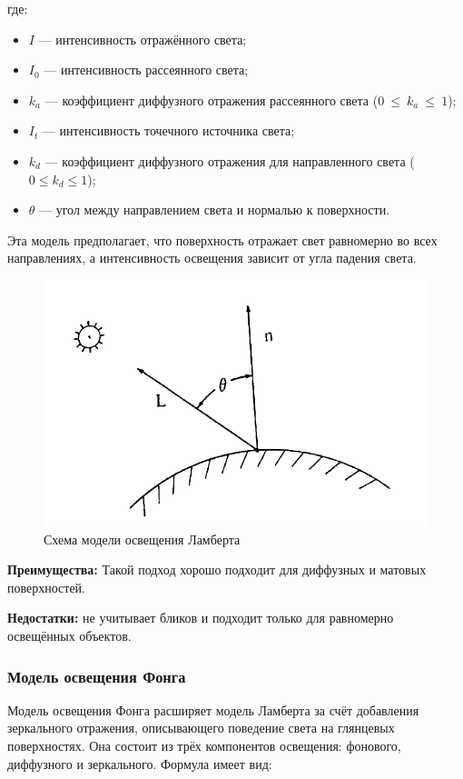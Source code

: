 где:
\begin{itemize}[label=---]
    \item $I$ — интенсивность отражённого света;
    \item $I_0$ — интенсивность рассеянного света;
    \item $k_a$ — коэффициент диффузного отражения рассеянного света ($0~\leq~k_a~\leq~1$);
    \item $I_t$ — интенсивность точечного источника света;
    \item $k_d$ — коэффициент диффузного отражения для направленного света ($0 \leq k_d \leq 1$);
    \item $\theta$ — угол между направлением света и нормалью к поверхности.
\end{itemize}

Эта модель предполагает, что поверхность отражает свет равномерно во всех направлениях, а интенсивность освещения зависит от угла падения света.

\begin{figure}[H]
    \centering
    \includegraphics[width=0.8\linewidth]{images/light/lambert.png}
    \caption{Схема модели освещения Ламберта}
    \label{fig:lambert}
\end{figure}

\textbf{Преимущества:} Такой подход хорошо подходит для диффузных и матовых поверхностей.

\textbf{Недостатки:} не учитывает бликов и подходит только для равномерно освещённых объектов.

\subsubsection{Модель освещения Фонга}

Модель освещения Фонга расширяет модель Ламберта за счёт добавления зеркального отражения, описывающего поведение света на глянцевых поверхностях. Она состоит из трёх компонентов освещения: фонового, диффузного и зеркального. Формула имеет вид:

